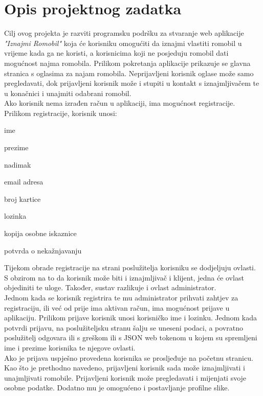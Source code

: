 \chapter{Opis projektnog zadatka}
		
		\indent Cilj ovog projekta je razviti programsku podršku za stvaranje web aplikacije \emph{"Iznajmi Romobil"} koja će korisniku omogućiti da iznajmi vlastiti romobil u vrijeme kada ga ne koristi, a korisnicima koji ne posjeduju romobil dati mogućnost najma romobila. \newline
		\indent Prilikom pokretanja aplikacije prikazuje se glavna stranica s oglasima za najam romobila. Neprijavljeni korisnik oglase može samo pregledavati, dok prijavljeni korisnik može i stupiti u kontakt s iznajmljivačem te u konačnici i unajmiti odabrani romobil. \\
		\indent Ako korisnik nema izrađen račun u aplikaciji, ima mogućnost registracije. Prilikom registracije, korisnik unosi:
		\begin{packed_item} 
			\item {ime}
			\item {prezime}
			\item {nadimak}
			\item {email adresa}
			\item {broj kartice}
			\item {lozinka}
			\item {kopija osobne iskaznice}
			\item {potvrda o nekažnjavanju}  
		\end{packed_item}
		\indent Tijekom obrade registracije na strani poslužitelja korisniku se dodjeljuju ovlasti. S obzirom na to da korisnik može biti i iznajmljivač i klijent, jedna će ovlast objediniti te uloge. Također, sustav razlikuje i ovlast administrator.  \\
		\indent Jednom kada se korisnik registrira te mu administrator prihvati zahtjev za registraciju, ili već od prije ima aktivan račun, ima mogućnost prijave u aplikaciju. Prilikom prijave korisnik unosi korisničko ime i lozinku. Jednom kada potvrdi prijavu, na poslužiteljsku stranu šalju se uneseni podaci, a povratno poslužitelj odgovara ili s greškom ili s JSON web tokenom u kojem su spremljeni ime i prezime korisnika te njegove ovlasti. \\
		\indent Ako je prijava uspješno provedena korisnika se prosljeđuje na početnu stranicu. Kao što je prethodno navedeno, prijavljeni korisnik sada može iznajmljivati i unajmljivati romobile. Prijavljeni korisnik može pregledavati i mijenjati svoje osobne podatke. Dodatno mu je omogućeno i postavljanje profilne slike.\\
